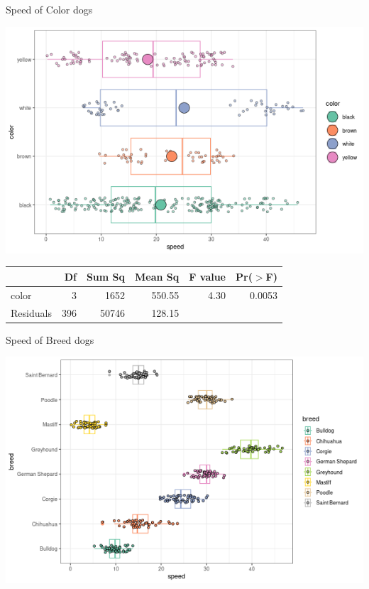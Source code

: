 \documentclass{beamer}
\begin{document}
\begin{frame}{Speed of Color dogs}
\small
\begin{center}
\includegraphics[scale=0.45]{color_dog_speed_mean.png}
\end{center}
\begin{table}[ht]
\centering
\begin{tabular}{lrrrrr}
  \hline
 & Df & Sum Sq & Mean Sq & F value & Pr($>$F) \\ 
  \hline
color       & 3 & 1652 & 550.55 & 4.30 & 0.0053 \\ 
  Residuals   & 396 & 50746 & 128.15 &  &  \\ 
   \hline
\end{tabular}
\end{table}
\end{frame}



\begin{frame}{Speed of Breed dogs}
\begin{center}
\includegraphics[scale=0.45]{breed_dog_speed.png}
\end{center}
\end{frame}
\end{document}
